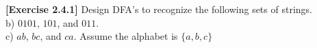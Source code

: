 \textbf{[Exercise 2.4.1]} Design DFA's to recognize the following sets of strings.\\
b) $0101$, $101$, and $011$.\\
c) $ab$, $bc$, and $ca$. Assume the alphabet is $\{a,b,c\}$
